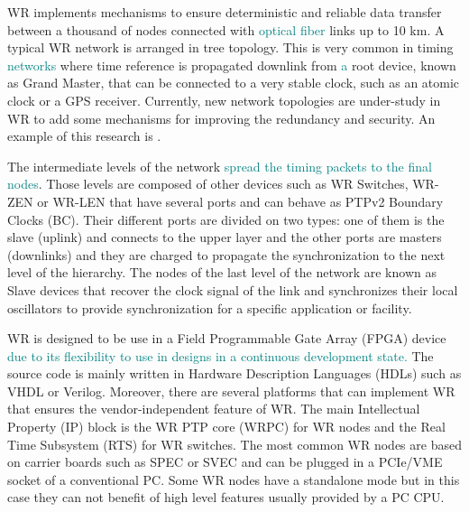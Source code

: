 WR implements mechanisms to ensure  deterministic and reliable data transfer between a thousand of nodes connected with  \textcolor{teal}{optical fiber} links up to 10 km. A typical WR network is arranged in tree topology. This is very common in timing \textcolor{teal}{networks} where time reference is propagated downlink from \textcolor{teal}{a} root device, known as Grand Master, that can be connected to a very stable clock, such as an atomic clock or a GPS receiver. Currently, new network topologies are under-study in WR to add some mechanisms for improving the redundancy and security. An example of this research is \cite{jlgutierrez-paper-redundancy}.

The intermediate levels of the network \textcolor{teal}{spread the timing packets to the final nodes}. Those levels are composed of other devices such as WR Switches, WR-ZEN or WR-LEN that have several ports and can behave as PTPv2 Boundary Clocks (BC). Their different ports are divided on two types: one of them is the slave (uplink) and connects to the upper layer and the other ports are masters (downlinks) and they are charged to propagate the synchronization to the next level of the hierarchy. The nodes of the last level of the network are known as Slave devices that recover the clock signal of the link and synchronizes their local oscillators to provide synchronization for a specific application or facility.


WR is designed to be use  in a Field Programmable Gate Array (FPGA) device \textcolor{teal}{due to its flexibility to use in designs in a continuous development state.}  The source code is mainly written in Hardware Description Languages (HDLs) such as VHDL or Verilog. Moreover, there are several platforms that can implement WR that ensures the vendor-independent feature of WR. The main Intellectual Property (IP) block is the WR PTP core (WRPC) for WR nodes and the Real Time Subsystem (RTS) for WR switches. The most common WR nodes are based on carrier boards such as SPEC or SVEC and can be plugged in a PCIe/VME socket of a conventional PC. Some WR nodes have a standalone mode but in this case they can not benefit of high level features usually provided by a PC CPU.

